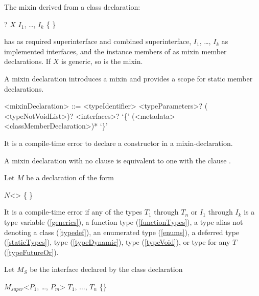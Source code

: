 \documentclass[makeidx]{article}
\begin{document}
\LMHash{}%
The mixin derived from a class declaration:

\begin{normativeDartCode}
\ABSTRACT? \CLASS{} $X$ \IMPLEMENTS{} $I_1$, \ldots, $I_k$ \{
\}
\end{normativeDartCode}

has  as required superinterface
and combined superinterface,
$I_1$, \ldots, $I_k$ as implemented interfaces,
and the instance members of  as mixin member declarations.
If $X$ is generic, so is the mixin.

\LMHash{}%
A mixin declaration introduces a mixin and provides a scope
for static member declarations.

\begin{grammar}
<mixinDeclaration> ::= \MIXIN{} <typeIdentifier> <typeParameters>?
  \gnewline{} (\ON{} <typeNotVoidList>)? <interfaces>?
  \gnewline{} `\{' (<metadata> <classMemberDeclaration>)* `\}'
\end{grammar}

\LMHash{}%
It is a compile-time error to declare a constructor in a mixin-declaration.

\LMHash{}%
A mixin declaration with no \code{\ON} clause is equivalent
to one with the clause .

\LMHash{}%
Let $M$ be a \MIXIN{} declaration of the form

\begin{normativeDartCode}
\MIXIN{} $N$<\TypeParametersStd> \ON{} 
    \IMPLEMENTS{}  \{
\}
\end{normativeDartCode}

\LMHash{}%
It is a compile-time error if any of the types $T_1$ through $T_n$
or $I_1$ through $I_k$ is
a type variable (\ref{generics}),
a function type (\ref{functionTypes}),
a type alias not denoting a class (\ref{typedef}),
an enumerated type (\ref{enums}),
a deferred type (\ref{staticTypes}),
type \DYNAMIC{} (\ref{typeDynamic}),
type \VOID{} (\ref{typeVoid}),
or type  for any $T$ (\ref{typeFutureOr}).

\LMHash{}%
Let $M_S$ be the interface declared by the class declaration

\begin{normativeDartCode}
\ABSTRACT{} \CLASS{} $M_{super}$<$P_1$, \ldots, $P_m$> \IMPLEMENTS{} $T_1$, $\dots{}$, $T_n$ \{\}
\end{normativeDartCode}
\end{document}
